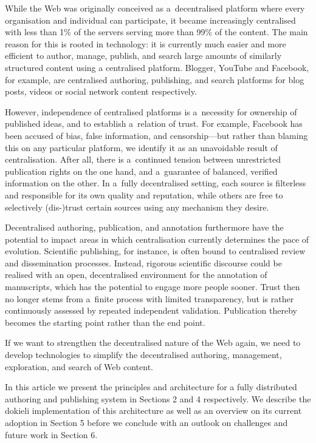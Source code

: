 \documentclass[a4paper]{llncs}
\begin{document}
\par While the Web was originally conceived as a decentralised platform where every organisation and individual can participate, it became increasingly centralised with \empty less than 1\% of the servers serving more than 99\% of the content. The main reason for this is rooted in technology: it is currently much easier and more efficient to author, manage, publish, and search large amounts of similarly structured content using a centralised platform. Blogger, YouTube and Facebook, for example, are centralised authoring, publishing, and search platforms for blog posts, videos or social network content respectively.

\par However, independence of centralised platforms is a necessity for ownership of published ideas, and to establish a relation of trust. For example, Facebook has been accused of bias, false information, and censorship—but rather than blaming this on any particular platform, we identify it as an unavoidable result of centralisation. After all, there is a continued tension between unrestricted publication rights on the one hand, and a guarantee of balanced, verified information on the other. In a fully decentralised setting, each source is filterless and responsible for its own quality and reputation, while others are free to selectively (dis-)trust certain sources using any mechanism they desire.

\par Decentralised authoring, publication, and annotation furthermore have the potential to impact areas in which centralisation currently determines the pace of evolution. Scientific publishing, for instance, is often bound to centralised review and dissemination processes. Instead, rigorous scientific discourse could be realised with an open, decentralised environment for the annotation of manuscripts, which has the potential to engage more people sooner. Trust then no longer stems from a finite process with limited transparency, but is rather continuously assessed by repeated independent validation. Publication thereby becomes the starting point rather than the end point.

\par If we want to strengthen the decentralised nature of the Web again, we need to develop technologies to simplify the decentralised authoring, management, exploration, and search of Web content.

\par In this article we present the principles and architecture for a fully distributed authoring and publishing system in Sections 2 and 4 respectively. We describe the dokieli implementation of this architecture as well as an overview on its current adoption in Section 5 before we conclude with an outlook on challenges and future work in Section 6.
\end{document}
